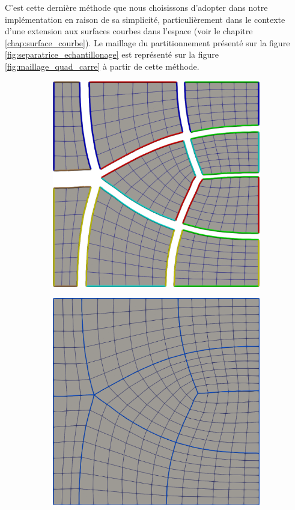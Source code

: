 C'est cette dernière méthode que nous choisissons d'adopter dans notre implémentation en raison de sa simplicité, particulièrement dans le contexte d'une extension aux surfaces courbes dans l'espace (voir le chapitre \ref{chap:surface_courbe}). Le maillage du partitionnement présenté sur la figure \ref{fig:separatrice_echantillonage} est représenté sur la figure \ref{fig:maillage_quad_carre} à partir de cette méthode.

\begin{figure}[h!]
\centering
\begin{subfigure}{0.49\textwidth}
    \includegraphics[width=\textwidth]{images/quad_eclatement.pdf}
    \label{fig:quad_eclatement}
\end{subfigure}
\hfill
\begin{subfigure}{0.49\textwidth}
    \includegraphics[width=\textwidth]{images/quad_carre.pdf}

\end{subfigure}
\end{figure}
